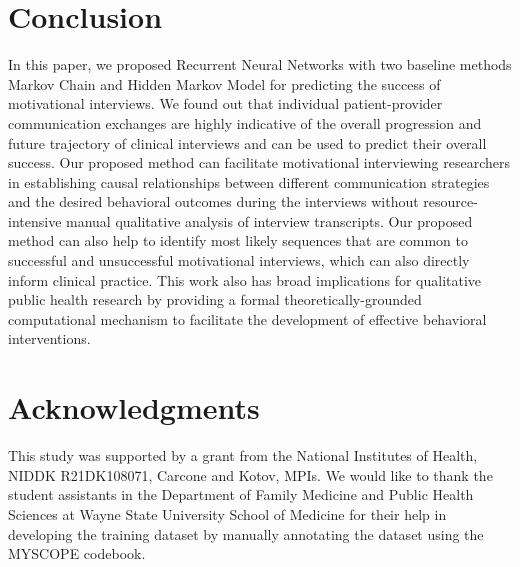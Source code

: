 \documentclass{amia_summit_2018}
\begin{document}
\section*{Conclusion}
In this paper, we proposed Recurrent Neural Networks with two baseline methods Markov Chain and Hidden Markov Model for predicting the success of motivational interviews. We found out that individual patient-provider communication exchanges are highly indicative of the overall progression and future trajectory of clinical interviews and can be used to predict their overall success. Our proposed method can facilitate motivational interviewing researchers in establishing causal relationships between different communication strategies and the desired behavioral outcomes during the interviews without resource-intensive manual qualitative analysis of interview transcripts. Our proposed method can also help to identify most likely sequences that are common to successful and unsuccessful motivational interviews, which can also directly inform clinical practice. This work also has broad implications for qualitative public health research by providing a formal theoretically-grounded computational mechanism to facilitate the development of effective behavioral interventions.

\section*{Acknowledgments}
This study was supported by a grant from the National Institutes of Health, NIDDK R21DK108071, Carcone and Kotov, MPIs. We would like to thank the student assistants in the Department of Family Medicine and Public Health Sciences at Wayne State University School of Medicine for their help in developing the training dataset by manually annotating the dataset using the MYSCOPE codebook. 



\end{document}
